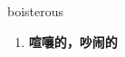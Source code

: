 
\begin{frame}
{\huge boisterous}
\begin{center}
\begin{enumerate}\Large
  \item \textbf{喧嚷的，吵闹的}
\end{enumerate}
\end{center}
\end{frame}
